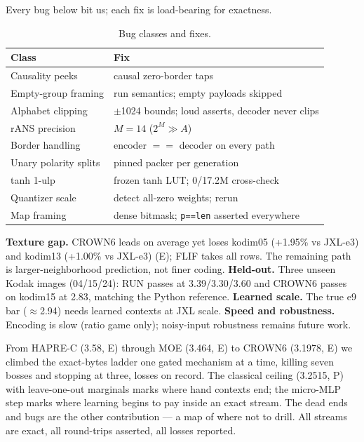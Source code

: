 \documentclass[smallabstract,smallcaptions]{dccpaper}
\begin{document}

Every bug below bit us; each fix is load-bearing for exactness.

\begin{table}[h]
\centering
\caption{Bug classes and fixes.}
\label{tab:bugs}
\begin{tabular}{@{}l p{3.3in}@{}}
\toprule
Class & Fix \\
\midrule
Causality peeks & causal zero-border taps \\
Empty-group framing & run semantics; empty payloads skipped \\
Alphabet clipping & $\pm$1024 bounds; loud asserts, decoder never clips \\
rANS precision & $M=14$ ($2^M\gg A$) \\
Border handling & encoder $==$ decoder on every path \\
Unary polarity splits & pinned packer per generation \\
tanh 1-ulp & frozen tanh LUT; 0/17.2M cross-check \\
Quantizer scale & detect all-zero weights; rerun \\
Map framing & dense bitmask; \texttt{p==len} asserted everywhere \\
\bottomrule
\end{tabular}
\end{table}


\textbf{Texture gap.} CROWN6 leads on average yet loses kodim05 (+1.95\% vs
JXL-e3) and kodim13 (+1.00\% vs JXL-e3) (E); FLIF takes all rows. The remaining
path is larger-neighborhood prediction, not finer coding. \textbf{Held-out.}
Three unseen Kodak images (04/15/24): RUN passes at 3.39/3.30/3.60 and CROWN6
passes on kodim15 at 2.83, matching the Python reference. \textbf{Learned scale.}
The true e9 bar ($\approx$2.94) needs learned contexts at JXL scale.
\textbf{Speed and robustness.} Encoding is slow (ratio game only); noisy-input
robustness remains future work.


From HAPRE-C (3.58, E) through MOE (3.464, E) to CROWN6 (3.1978, E) we climbed the exact-bytes
ladder one gated mechanism at a time, killing seven bosses and stopping at
three, losses on record. The classical ceiling (3.2515, P) with
leave-one-out marginals marks where hand contexts end; the micro-MLP step
marks where learning begins to pay inside an exact stream. The dead ends
and bugs are the other contribution --- a map of where not to drill. All
streams are exact, all round-trips asserted, all losses reported.
\end{document}
